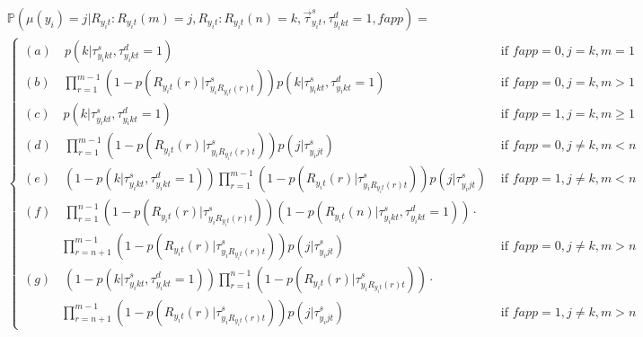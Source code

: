 \documentclass{article}
\begin{document}
{\small
\begin{align*}
   &\mathbb{P} \left( \mu(y_i) = j | R_{y_i t}: R_{y_i t}(m) = j, R_{y_i t}: R_{y_i t}(n) = k, \vec{\tau}^{s}_{y_it}, \tau^{d}_{y_ikt} = 1, fapp  \right) =  \\
   & \begin{cases}
    (a) \quad p\left(k | \tau^{s}_{y_ikt}, \tau^{d}_{y_ikt} = 1\right)    & \text{ if } fapp = 0, j = k, m = 1\\
    (b) \quad \prod_{r=1}^{m-1} \left(1-p\left(R_{y_it}(r)| \tau^{s}_{y_iR_{y_it}(r)t}\right)\right) p\left(k | \tau^{s}_{y_ikt}, \tau^{d}_{y_ikt} = 1\right)    & \text{ if } fapp = 0, j = k, m > 1\\
    (c) \quad p\left(k | \tau^{s}_{y_ikt}, \tau^{d}_{y_ikt} = 1\right)  & \text{ if } fapp = 1, j = k, m\geq 1\\
    (d) \quad \prod_{r=1}^{m-1} \left(1-p\left(R_{y_it}(r)| \tau^{s}_{y_iR_{y_it}(r)t}\right)\right) p\left(j | \tau^{s}_{y_ijt}\right) & \text{ if } fapp = 0, j \neq k, m < n \\
    (e) \quad \left( 1 - p\left(k | \tau^{s}_{y_ikt}, \tau^{d}_{y_ikt} = 1\right) \right) \prod_{r=1}^{m-1} \left(1-p\left(R_{y_it}(r)| \tau^{s}_{y_iR_{y_it}(r)t}\right)\right) p\left(j | \tau^{s}_{y_ijt}\right)  & \text{ if } fapp = 1, j \neq k, m < n \\
    (f) \quad \prod_{r=1}^{n-1} \left(1-p\left(R_{y_it}(r)| \tau^{s}_{y_iR_{y_it}(r)t}\right)\right)  \left(1-p\left(R_{y_it}(n)| \tau^{s}_{y_ikt}, \tau^{d}_{y_ikt} = 1 \right)\right) \cdot \\
     \quad \quad \quad \prod_{r=n+1}^{m-1} \left(1-p\left(R_{y_it}(r)| \tau^{s}_{y_iR_{y_it}(r)t}\right)\right)  p\left(j | \tau^{s}_{y_ijt}\right) & \text{ if } fapp = 0, j \neq k, m > n \\
    (g) \quad \left( 1 - p\left(k | \tau^{s}_{y_ikt}, \tau^{d}_{y_ikt} = 1\right) \right) \prod_{r=1}^{n-1} \left(1-p\left(R_{y_it}(r)| \tau^{s}_{y_iR_{y_it}(r)t}\right)\right) \cdot \\
     \quad \quad \quad \prod_{r=n+1}^{m-1} \left(1-p\left(R_{y_it}(r)| \tau^{s}_{y_iR_{y_it}(r)t}\right)\right) p\left(j | \tau^{s}_{y_ijt}\right) & \text{ if } fapp = 1, j \neq k, m > n 
    \end{cases} \\
\end{align*}
}

\end{document}
